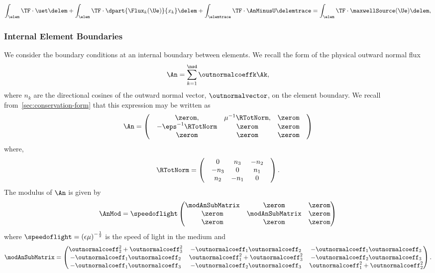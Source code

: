 \begin{equation}
\int_{\elem} \TF \cdot \uet \delem  + \int_{\elem} \TF \cdot \dpart{\Flux_{k}(\Ue)}{x_k} \delem + \int_{\elemtrace} \TF \cdot \AnMinusU \delemtrace = \int_{\elem} \TF  \cdot \maxwellSource(\Ue) \delem,
\label{eq:weak-form-with-physical-flux}
\end{equation}

\subsubsection{Internal Element Boundaries}
We consider the boundary conditions at an internal boundary between elements. We recall the form of the physical outward normal flux
$$\An = \sum_{k=1}^{\nsd} \outnormalcoeffk \Ak ,$$
where $n_k$ are the directional cosines of the outward normal vector, $\outnormalvector$, on the element boundary. We recall from~\ref{sec:conservation-form} that this expression may be written as
$$
  \An =
  \begin{pmatrix}
 & \zerom , & \mu^{-1} \RTotNorm, & \zerom \\
 & - \eps^{-1} \RTotNorm & \zerom & \zerom \\
 & \zerom & \zerom & \zerom 
 & \end{pmatrix}
$$
where,
$$
  \RTotNorm =
  \begin{pmatrix}
 & 0 & n_3 & -n_2 \\
 & -n_3 & 0 & n_1 \\
& n_2 & -n_1 & 0 
 & \end{pmatrix} .
$$
The modulus of $\An$ is given by
\begin{align*}
\AnMod = \speedoflight
\begin{pmatrix}
  \modAnSubMatrix & \zerom & \zerom \\
  \zerom  & \modAnSubMatrix & \zerom \\
   \zerom & \zerom & \zerom 
\end{pmatrix}
\end{align*}
where $\speedoflight = \left( \epsilon \mu  \right)^{-\frac{1}{2}}$ is the speed of light in the medium and
\begin{align*}
  \modAnSubMatrix = 
\begin{pmatrix}
\outnormalcoeff_2^2 + \outnormalcoeff_3^2 &      -\outnormalcoeff_1 \outnormalcoeff_2 &      -\outnormalcoeff_1 \outnormalcoeff_3 \\
-\outnormalcoeff_1 \outnormalcoeff_2 & \outnormalcoeff_1^2 + \outnormalcoeff_3^2 &      -\outnormalcoeff_2 \outnormalcoeff_3 \\
-\outnormalcoeff_1 \outnormalcoeff_3 &      -\outnormalcoeff_2 \outnormalcoeff_3 & \outnormalcoeff_1^2 + \outnormalcoeff_2^2 \\
\end{pmatrix} .
\end{align*}
